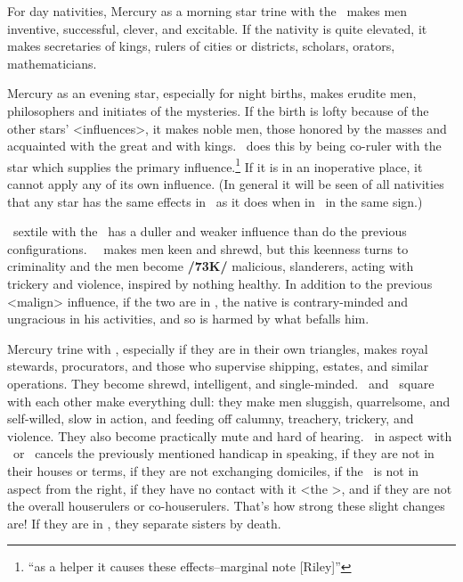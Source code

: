 For day nativities, Mercury \marginnote{\Mercury \Trine \Moon} as a morning star trine with the \Moon\, makes men inventive, successful, clever, and excitable. If the nativity is quite elevated, it makes secretaries of kings, rulers of cities or districts, scholars, orators, mathematicians.

Mercury as an evening star, especially for night births, makes erudite men, philosophers and initiates of the mysteries. If the birth is lofty because of the other stars’ <influences>, it makes noble men, those honored by the masses and acquainted with the great and with kings. \Mercury\, does this by being co-ruler with the star which supplies the primary influence.\footnote{``as a helper it causes these effects--marginal note [Riley]''}
If it is in an inoperative place, it cannot apply any of its own influence. (\mndl In general it will be seen of all nativities that any star has the same effects in \Trine\, as it does when in \Conjunction\, in the same sign.)

\Mercury\, sextile with the \Moon\, has a duller and weaker influence than do the previous configurations. \Mercury\, \Square\, makes men keen and shrewd, but this keenness turns to criminality and the men become \textbf{/73K/} malicious, slanderers, acting with trickery and violence, inspired by nothing healthy. In addition to the previous <malign> influence, if the two are in \Opposition, the native is contrary-minded and ungracious in his activities, and so is harmed by what befalls him.

Mercury \marginnote{\Mercury \Trine \Saturn} trine with \Saturn, especially if they are in their own triangles, makes royal stewards, procurators, and those who supervise shipping, estates, and similar operations. They become shrewd,
intelligent, and single-minded. \Mercury\, and \Saturn\, square with each other make everything dull: they make men sluggish, quarrelsome, and self-willed, slow in action, and feeding off calumny, treachery, trickery, and violence. They also become practically mute and hard of hearing. \Mars\, in aspect with \Saturn\,
or \Mercury\, cancels the previously mentioned handicap in speaking, if they are not in their houses or terms,
if they are not exchanging domiciles, if the \Moon\, is not in aspect from the right, if they have no contact with it <the \Moon>, and if they are not the overall houserulers or co-houserulers. \mndl That’s how strong these slight changes are! If they are in \Opposition, they separate sisters by death.

